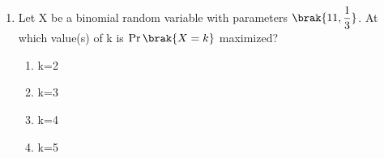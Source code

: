 \renewcommand{\theequation}{\theenumi}
\renewcommand{\thefigure}{\theenumi}
\renewcommand{\thetable}{\theenumi}
\begin{enumerate}[label=\thesection.\arabic*.,ref=\thesection.\theenumi]

\item Let X be a binomial random variable with parameters  $\brak{11,\displaystyle{\frac{1}{3}}}$. At which value(s) of k is $\Pr\brak{X = k}$ maximized?\\
\begin{enumerate}
\item k=2
\item k=3
\item k=4
\item k=5
\end{enumerate}
%
\solution


\end{enumerate}